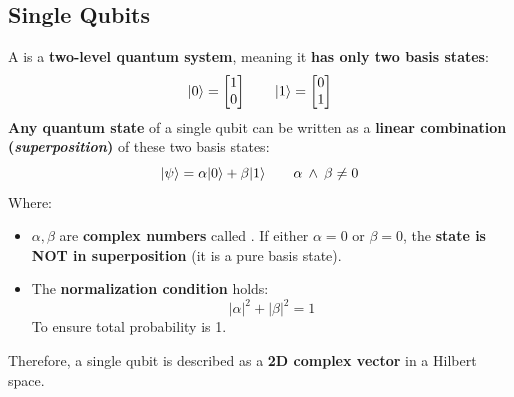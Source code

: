 \subsection{Single Qubits}\label{subsection: Single Qubits}

A  is a \textbf{two-level quantum system}, meaning it \textbf{has only two basis states}:
\begin{equation*}
    | 0 \rangle = \begin{bmatrix}
        1 \\ 0
    \end{bmatrix}
    \hspace{2em}
    | 1 \rangle = \begin{bmatrix}
        0 \\ 1
    \end{bmatrix}
\end{equation*}
\textbf{Any quantum state} of a single qubit can be written as a \textbf{linear combination (\emph{superposition})} of these two basis states:
\begin{equation*}
    | \psi \rangle = \alpha | 0 \rangle + \beta | 1 \rangle \hspace{2em} \alpha \: \land \: \beta \ne 0
\end{equation*}
Where:
\begin{itemize}
    \item $\alpha, \beta$ are \textbf{complex numbers} called . If either $\alpha = 0$ or $\beta = 0$, the \textbf{state is NOT in superposition} (it is a pure basis state).
    \item The \textbf{normalization condition} holds:
    \begin{equation*}
        \left|\alpha\right|^{2} + \left|\beta\right|^{2} = 1
    \end{equation*}
    To ensure total probability is 1.
\end{itemize}
Therefore, a single qubit is described as a \textbf{2D complex vector} in a Hilbert space.

